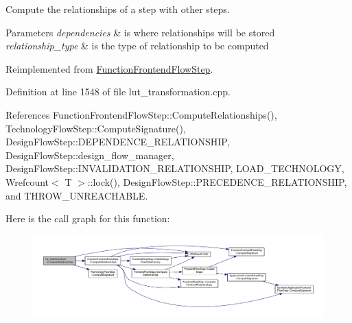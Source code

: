 Compute the relationships of a step with other steps. 


\begin{DoxyParams}{Parameters}
{\em dependencies} & is where relationships will be stored \\
\hline
{\em relationship\+\_\+type} & is the type of relationship to be computed \\
\hline
\end{DoxyParams}


Reimplemented from \hyperlink{classFunctionFrontendFlowStep_a1a815ea7885f3e92e414dadd40c43cba}{Function\+Frontend\+Flow\+Step}.



Definition at line 1548 of file lut\+\_\+transformation.\+cpp.



References Function\+Frontend\+Flow\+Step\+::\+Compute\+Relationships(), Technology\+Flow\+Step\+::\+Compute\+Signature(), Design\+Flow\+Step\+::\+D\+E\+P\+E\+N\+D\+E\+N\+C\+E\+\_\+\+R\+E\+L\+A\+T\+I\+O\+N\+S\+H\+IP, Design\+Flow\+Step\+::design\+\_\+flow\+\_\+manager, Design\+Flow\+Step\+::\+I\+N\+V\+A\+L\+I\+D\+A\+T\+I\+O\+N\+\_\+\+R\+E\+L\+A\+T\+I\+O\+N\+S\+H\+IP, L\+O\+A\+D\+\_\+\+T\+E\+C\+H\+N\+O\+L\+O\+GY, Wrefcount$<$ T $>$\+::lock(), Design\+Flow\+Step\+::\+P\+R\+E\+C\+E\+D\+E\+N\+C\+E\+\_\+\+R\+E\+L\+A\+T\+I\+O\+N\+S\+H\+IP, and T\+H\+R\+O\+W\+\_\+\+U\+N\+R\+E\+A\+C\+H\+A\+B\+LE.

Here is the call graph for this function\+:
\nopagebreak
\begin{figure}[H]
\begin{center}
\leavevmode
\includegraphics[width=350pt]{d4/d19/classlut__transformation_a91631c01821c79e4c92f0be5d92af0a4_cgraph}
\end{center}
\end{figure}
\mbox{\label{classlut__transformation_a41cd40761d625f5f747b78b51d545c95}} 
